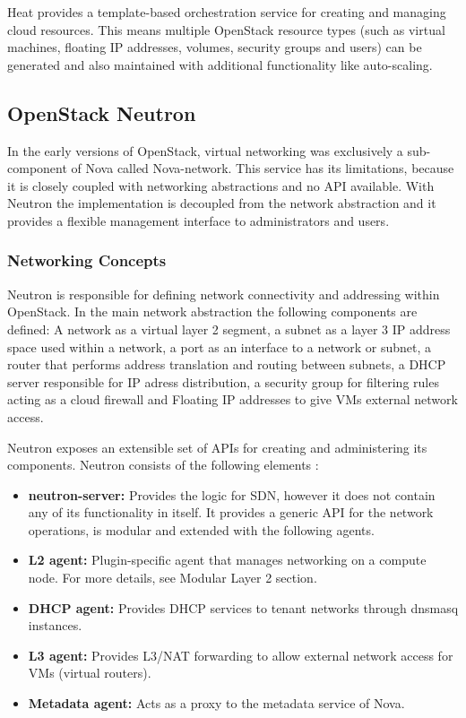Heat provides a template-based orchestration service for creating and managing cloud resources. This means multiple OpenStack resource types (such as virtual machines, floating IP addresses, volumes, security groups and users) can be generated and also maintained with additional functionality like auto-scaling.


\subsection{OpenStack Neutron}

In the early versions of OpenStack, virtual networking was exclusively a sub-component of Nova called Nova-network. This service has its limitations, because it is closely coupled with networking abstractions and no API available. With Neutron the implementation is decoupled from the network abstraction and it provides a flexible management interface to administrators and users.


\subsubsection{Networking Concepts}

Neutron is responsible for defining network connectivity and addressing within OpenStack. In the main network abstraction the following components are defined:
A network as a virtual layer 2 segment, a subnet as a layer 3 IP address space used within a network, a port as an interface to a network or subnet, a router that performs address translation and routing between subnets, a DHCP server responsible for IP adress distribution, a security group for filtering rules acting as a cloud firewall and Floating IP addresses to give VMs external network access.

Neutron exposes an extensible set of APIs for creating and administering its components. Neutron consists of the following elements \cite{openstack-training}:
\begin{itemize}
\item \textbf{neutron-server:} Provides the logic for SDN, however it does not contain any of its functionality in itself. It provides a generic API for the network operations, is modular and extended with the following agents.
\item \textbf{L2 agent:} Plugin-specific agent that manages networking on a compute node. For more details, see Modular Layer 2 section.
\item \textbf{DHCP agent:} Provides DHCP services to tenant networks through dnsmasq instances.
\item \textbf{L3 agent:} Provides L3/NAT forwarding to allow external network access for VMs (virtual routers).
\item \textbf{Metadata agent:} Acts as a proxy to the metadata service of Nova.
\end{itemize}

